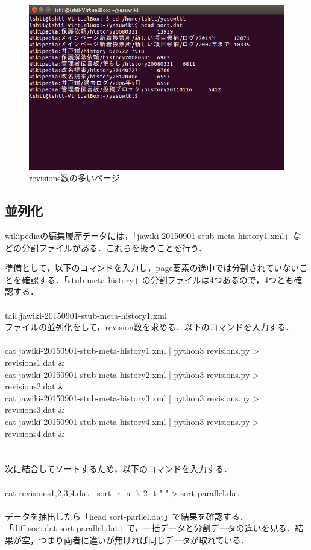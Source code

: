 \begin{figure}[H]
\centering
\includegraphics[width=14cm]{head_sort.png}
\caption{revisions数の多いページ}\label{サンプル図}
\end{figure}




\subsection{並列化}

wikipediaの編集履歴データには，「jawiki-20150901-stub-meta-history1.xml」などの分割ファイルがある．これらを扱うことを行う．

準備として，以下のコマンドを入力し，page要素の途中では分割されていないことを確認する．「stub-meta-history」の分割ファイルは4つあるので，4つとも確認する．
\\
\\
tail jawiki-20150901-stub-meta-history1.xml
\\
ファイルの並列化をして，revision数を求める．以下のコマンドを入力する．
\\
\\
cat jawiki-20150901-stub-meta-history1.xml | python3 revisions.py > revisions1.dat \& \\
cat jawiki-20150901-stub-meta-history2.xml | python3 revisions.py > revisions2.dat \& \\
cat jawiki-20150901-stub-meta-history3.xml | python3 revisions.py > revisions3.dat \& \\
cat jawiki-20150901-stub-meta-history4.xml | python3 revisions.py > revisions4.dat \& \\
\\
\\
次に結合してソートするため，以下のコマンドを入力する．
\\
\\
cat revisions{1,2,3,4}.dat | sort -r -n -k 2 -t "   " > sort-parallel.dat
\\
\\
データを抽出したら「head sort-parllel.dat」で結果を確認する． \\
「diff sort.dat sort-parallel.dat」で，一括データと分割データの違いを見る．結果が空，つまり両者に違いが無ければ同じデータが取れている．




